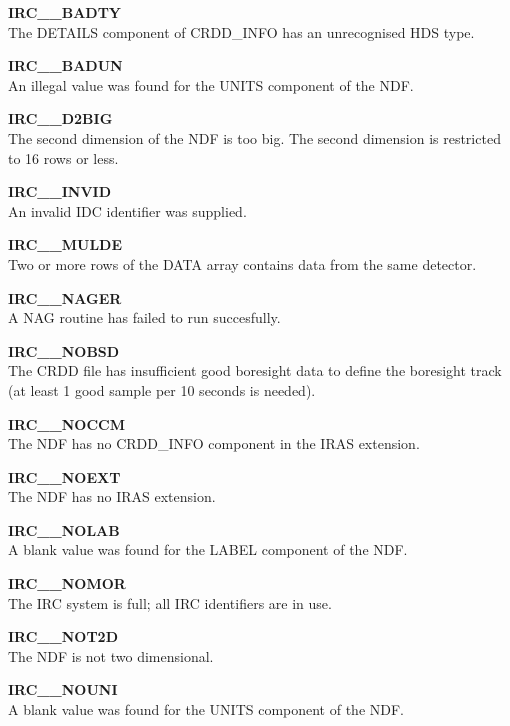\begin{description}
\item {\bf IRC\_\_BADTY     }\\
The DETAILS component of CRDD\_INFO has an unrecognised HDS type.

\item {\bf IRC\_\_BADUN     }\\
An illegal value was found for the UNITS component of the NDF.

\item {\bf IRC\_\_D2BIG     }\\
The second dimension of the NDF is too big. The second dimension is restricted
to 16 rows or less.

\item {\bf IRC\_\_INVID     }\\
An invalid IDC identifier was supplied.

\item {\bf IRC\_\_MULDE     }\\
Two or more rows of the DATA array contains data from the same detector.

\item {\bf IRC\_\_NAGER     }\\
A NAG routine has failed to run succesfully.

\item {\bf IRC\_\_NOBSD     }\\
The CRDD file has insufficient good boresight data to define the boresight
track (at least 1 good sample per 10 seconds is needed).

\item {\bf IRC\_\_NOCCM     }\\
The NDF has no CRDD\_INFO component in the IRAS extension.

\item {\bf IRC\_\_NOEXT     }\\
The NDF has no IRAS extension.

\item {\bf IRC\_\_NOLAB     }\\
A blank value was found for the LABEL component of the NDF.

\item {\bf IRC\_\_NOMOR     }\\
The IRC system is full; all IRC identifiers are in use.

\item {\bf IRC\_\_NOT2D     }\\
The NDF is not two dimensional.

\item {\bf IRC\_\_NOUNI     }\\
A blank value was found for the UNITS component of the NDF.


\end{description}
